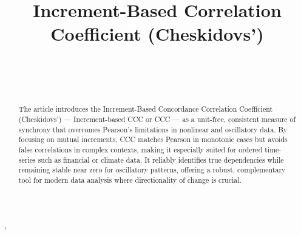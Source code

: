\documentclass[aos]{imsart}
\begin{document}
\begin{frontmatter}
\title{Increment-Based Correlation Coefficient (Cheskidovs’)}

\begin{aug}
\author[A]{~},
\author[B]{~}
\address[A]{Independent Researcher}
\address[B]{Ural Federal University, Yekaterinburg, Russia}
\end{aug}

\begin{abstract}
The article introduces the Increment-Based Concordance Correlation Coefficient (Cheskidovs’) — Increment-based CCC or CCC — as a unit-free, consistent measure of synchrony that overcomes Pearson’s limitations in nonlinear and oscillatory data. By focusing on mutual increments, CCC matches Pearson in monotonic cases but avoids false correlations in complex contexts, making it especially suited for ordered time-series such as financial or climate data. It reliably identifies true dependencies while remaining stable near zero for oscillatory patterns, offering a robust, complementary tool for modern data analysis where directionality of change is crucial.
\end{abstract}

\begin{keyword}[class=MSC]
\end{keyword}

\begin{keyword}
\end{keyword}

\end{frontmatter}
\end{document}
